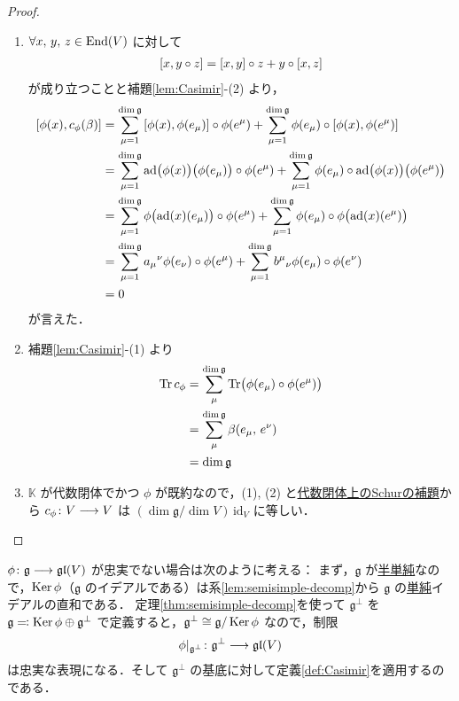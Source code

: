 \documentclass[rep_main]{subfiles}
\begin{document}
\begin{proof}
	\begin{enumerate}
		\item $\forall x,\,y,\, z\in \operatorname{End} (V)$ に対して
		\begin{align}
			\comm{x}{y \circ z} = \comm{x}{y} \circ z + y \circ \comm{x}{z}
		\end{align}
		が成り立つことと補題\ref{lem:Casimir}-(2) より，
		\begin{align}
			\comm{\phi(x)}{c_\phi(\beta)} 
			&= \sum_{\mu=1}^{\dim \mathfrak{g}} \comm{\phi(x)}{\phi(e_\mu)} \circ \phi(e^\mu) + \sum_{\mu=1}^{\dim \mathfrak{g}} \phi(e_\mu) \circ \comm{\phi(x)}{\phi(e^\mu)} \\
			&= \sum_{\mu=1}^{\dim \mathfrak{g}} \ad\bigl(\phi(x)\bigr)\bigl(\phi(e_\mu)\bigr) \circ \phi(e^\mu) + \sum_{\mu=1}^{\dim \mathfrak{g}} \phi(e_\mu) \circ  \ad\bigl(\phi(x)\bigr)\bigl(\phi(e^\mu)\bigr) \\
			&= \sum_{\mu=1}^{\dim \mathfrak{g}} \phi\bigl(\ad(x)(e_\mu)\bigr) \circ \phi(e^\mu) + \sum_{\mu=1}^{\dim \mathfrak{g}} \phi(e_\mu) \circ  \phi\bigl(\ad(x)(e^\mu)\bigr) \\
			&= \sum_{\mu=1}^{\dim \mathfrak{g}} a_\mu{}^\nu \phi(e_\nu) \circ \phi(e^\mu) + \sum_{\mu=1}^{\dim \mathfrak{g}} b^\mu{}_\nu\phi(e_\mu) \circ \phi(e^\nu) \\
			&= 0
		\end{align}
		が言えた．
		\item 補題\ref{lem:Casimir}-(1) より
		\begin{align}
			\Tr c_\phi 
			&= \sum_{\mu}^{\dim \mathfrak{g}} \Tr \bigl(\phi(e_\mu) \circ \phi(e^\mu) \bigr) \\
			&= \sum_{\mu}^{\dim \mathfrak{g}} \beta (e_\mu,\, e^\nu) \\
			&= \dim \mathfrak{g}
		\end{align}
		\item $\mathbb{K}$ が代数閉体でかつ $\phi$ が既約なので，(1), (2) と\hyperref[col:Schur-closed]{代数閉体上のSchurの補題}から $c_\phi \colon V \longrightarrow V$ は $(\dim \mathfrak{g} / \dim V) \, \mathrm{id}_V$ に等しい．
	\end{enumerate}
	
\end{proof}


$\phi \colon \mathfrak{g} \longrightarrow \mathfrak{gl} (V)$ が忠実でない場合は次のように考える：
まず，$\mathfrak{g}$ が\hyperref[def:semisimple-LieAlg]{半単純}なので，$\operatorname{Ker} \phi$（$\mathfrak{g}$ のイデアルである）は系\ref{lem:semisimple-decomp}から $\mathfrak{g}$ の\hyperref[def:simple-LieAlg]{単純}イデアルの直和である．
定理\ref{thm:semisimple-decomp}を使って $\mathfrak{g}^\perp$ を $\mathfrak{g} \eqqcolon \operatorname{Ker} \phi \oplus \mathfrak{g}^\perp$ で定義すると，$\mathfrak{g}^\perp \cong \mathfrak{g}/\operatorname{Ker} \phi$ なので，制限
\begin{align}
	\phi|_{\mathfrak{g}^\perp} \colon \mathfrak{g}^\perp \longrightarrow \mathfrak{gl} (V)
\end{align}
は忠実な表現になる．そして $\mathfrak{g}^\perp$ の基底に対して定義\ref{def:Casimir}を適用するのである．
\end{document}
